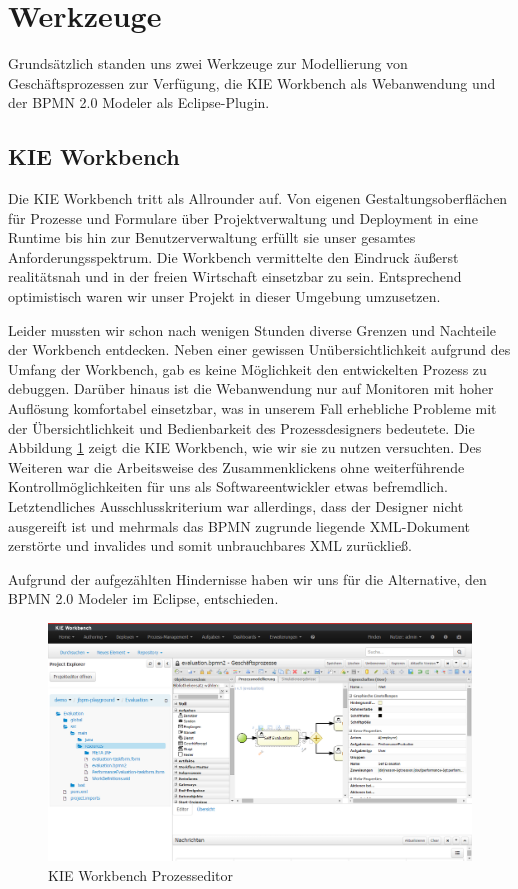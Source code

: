 \section{Werkzeuge}
Grundsätzlich standen uns zwei Werkzeuge zur Modellierung von Geschäftsprozessen zur Verfügung, die KIE Workbench als Webanwendung und der BPMN 2.0 Modeler als Eclipse-Plugin.
\subsection{KIE Workbench}
Die KIE Workbench tritt als Allrounder auf. Von eigenen Gestaltungsoberflächen für Prozesse und Formulare über Projektverwaltung und Deployment in eine Runtime bis hin zur Benutzerverwaltung erfüllt sie unser gesamtes Anforderungsspektrum. Die Workbench vermittelte den Eindruck äußerst realitätsnah und in der freien Wirtschaft einsetzbar zu sein. Entsprechend optimistisch waren wir unser Projekt in dieser Umgebung umzusetzen.

Leider mussten wir schon nach wenigen Stunden diverse Grenzen und Nachteile der Workbench entdecken. Neben einer gewissen Unübersichtlichkeit aufgrund des Umfang der Workbench, gab es keine Möglichkeit den entwickelten Prozess zu debuggen. Darüber hinaus ist die Webanwendung nur auf Monitoren mit hoher Auflösung komfortabel einsetzbar, was in unserem Fall erhebliche Probleme mit der Übersichtlichkeit und Bedienbarkeit des Prozessdesigners bedeutete. Die Abbildung \ref{fig:KieWorkbench} zeigt die KIE Workbench, wie wir sie zu nutzen versuchten. Des Weiteren war die Arbeitsweise des Zusammenklickens ohne weiterführende Kontrollmöglichkeiten für uns als Softwareentwickler etwas befremdlich. Letztendliches Ausschlusskriterium war allerdings, dass der Designer nicht ausgereift ist und mehrmals das BPMN zugrunde liegende XML-Dokument zerstörte und invalides und somit unbrauchbares XML zurückließ. 

Aufgrund der aufgezählten Hindernisse haben wir uns für die Alternative, den BPMN 2.0 Modeler im Eclipse, entschieden.

\begin{figure}[H]
\centering
\includegraphics[width=0.9\linewidth]{../Bilder/KieWorkbench}
\caption{KIE Workbench Prozesseditor}
\label{fig:KieWorkbench}
\end{figure}

